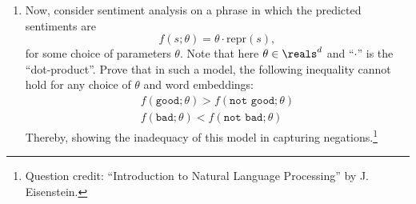 \begin{enumerate}
    \item  Now, consider sentiment analysis on a phrase in which the predicted sentiments are 
        $$ f(s; \theta) = \theta \cdot \text{repr}(s), $$
        for some choice of parameters $\theta$. 
        Note that here $\theta  \in \reals^d$ and ``$\cdot$'' is the ``dot-product''. 
        Prove that in such a model, the following inequality cannot hold for any choice of $\theta$ and word embeddings: 
        \begin{align*}
            f(\texttt{good}; \theta)  > f(\texttt{not good}; \theta)    \\ 
            f(\texttt{bad}; \theta)  < f(\texttt{not bad}; \theta)
        \end{align*}
        Thereby, showing the inadequacy of this model in capturing negations.\footnote{Question credit: ``Introduction to Natural Language Processing'' by J. Eisenstein.} \\ 
\end{enumerate}

